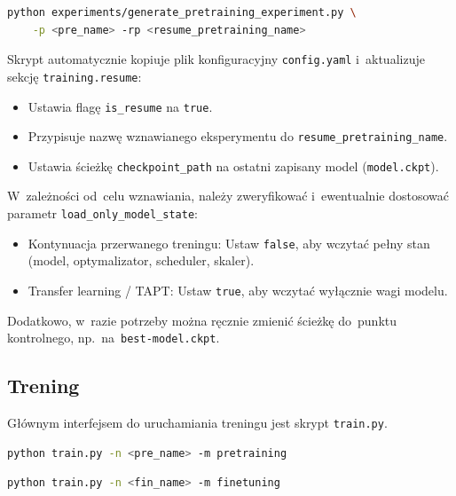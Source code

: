 \documentclass[a4paper,11pt,twoside]{report}
\theoremstyle{definition}
\begin{document}
\begin{lstlisting}[language=bash, caption={Generowanie eksperymentu pretreningu (wznawianego z wcześniejszego eksperymentu).}]
python experiments/generate_pretraining_experiment.py \
    -p <pre_name> -rp <resume_pretraining_name>
\end{lstlisting}
Skrypt automatycznie kopiuje plik konfiguracyjny \texttt{config.yaml} i~aktualizuje sekcję \texttt{training.resume}:
\begin{itemize}
    \item Ustawia flagę \texttt{is\_resume} na \texttt{true}.
    \item Przypisuje nazwę wznawianego eksperymentu do \texttt{resume\_pretraining\_name}.
    \item Ustawia ścieżkę \texttt{checkpoint\_path} na ostatni zapisany model (\texttt{model.ckpt}).
\end{itemize}
W~zależności od~celu wznawiania, należy zweryfikować i~ewentualnie dostosować parametr \texttt{load\_only\_model\_state}:
\begin{itemize}
    \item Kontynuacja przerwanego treningu: Ustaw \texttt{false}, aby wczytać pełny stan (model, optymalizator, scheduler, skaler).
    \item Transfer learning / TAPT: Ustaw \texttt{true}, aby wczytać wyłącznie wagi modelu.
\end{itemize}
Dodatkowo, w~razie potrzeby można ręcznie zmienić ścieżkę do~punktu kontrolnego, np.\ na~\texttt{best-model.ckpt}.

\subsection{Trening}
Głównym interfejsem do uruchamiania treningu jest skrypt \texttt{train.py}.

\begin{lstlisting}[language=bash, caption={Uruchomienie pretreningu}]
python train.py -n <pre_name> -m pretraining
\end{lstlisting}

\begin{lstlisting}[language=bash, caption={Uruchomienie dostrajania}]
python train.py -n <fin_name> -m finetuning
\end{lstlisting}
\end{document}
